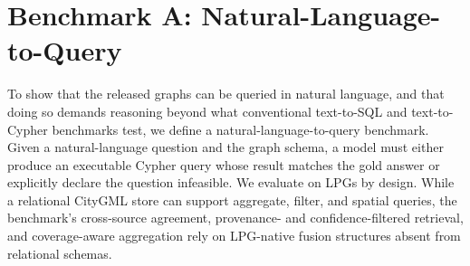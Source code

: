 \documentclass[sigconf,authordraft]{acmart}
\newcommand{\addedcite}[1]{\begingroup\setlength{\fboxsep}{1pt}\colorbox{yellow}{\cite{#1}}\endgroup}
\newcommand{\verify}[1]{\begingroup\setlength{\fboxsep}{1pt}\colorbox{red!25}{#1}\endgroup}
\begin{document}

\section{Benchmark A: Natural-Language-to-Query}\label{subsec:query_tasks}

To show that the released graphs can be queried in natural language, and that doing so demands reasoning beyond what conventional text-to-SQL and text-to-Cypher benchmarks test, we define a natural-language-to-query benchmark. Given a natural-language question and the graph schema, a model must either produce an executable Cypher query whose result matches the gold answer or explicitly declare the question infeasible. We evaluate on LPGs by design. While a relational CityGML store can support aggregate, filter, and spatial queries, the benchmark's cross-source agreement, provenance- and confidence-filtered retrieval, and coverage-aware aggregation rely on LPG-native fusion structures absent from relational schemas.
\end{document}
